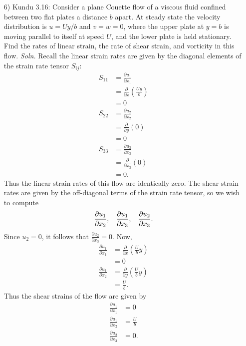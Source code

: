 \documentclass{article}
\begin{document}
\begin{itemize}
    \pagebreak
    \item[6)] Kundu 3.16: Consider a plane Couette flow of a viscous fluid confined between two flat plates a distance $b$ apart. At steady state the velocity distribution is $u = Uy/b$ and $v = w = 0$, where the upper plate at $y = b$ is moving parallel to itself at speed $U$, and the lower plate is held stationary. Find the rates of linear strain, the rate of shear strain, and vorticity in this flow.
    \newline\newline
    \textit{Soln.} Recall the linear strain rates are given by the diagonal elements of the strain rate tensor $S_{ij}$:
    \begin{align*}
        S_{11} &= \frac{\partial u_1}{\partial x_1}\\
        &= \frac{\partial }{\partial x}\left(\frac{Uy}{b}\right)\\
        &= 0\\
        S_{22} &= \frac{\partial u_2}{\partial x_2}\\
        &= \frac{\partial}{\partial y}\left(0\right)\\
        &= 0\\
        S_{33} &= \frac{\partial u_3}{\partial x_3}\\
        &= \frac{\partial }{\partial x_3}\left(0\right)\\
        &= 0.
    \end{align*}
    Thus the linear strain rates of this flow are identically zero. The shear strain rates are given by the off-diagonal terms of the strain rate tensor, so we wish to compute
    \[\frac{\partial u_1}{\partial x_2}, \hspace{0.3cm} \frac{\partial u_1}{\partial x_3}, \hspace{0.3cm} \frac{\partial u_2}{\partial x_3}.\]
    Since $u_2 = 0$, it follows that $\frac{\partial u_2}{\partial x_3} = 0$. Now, 
    \begin{align*}
        \frac{\partial u_1}{\partial x_1} &= \frac{\partial }{\partial x}\left(\frac{U}{b}y\right)\\
        &= 0\\
        \frac{\partial u_1}{\partial x_2} &= \frac{\partial }{\partial y}\left(\frac{U}{b}y\right)\\
        &= \frac{U}{b}.
    \end{align*}
    Thus the shear strains of the flow are given by
    \begin{align*}
        \frac{\partial u_1}{\partial x_1} &= 0\\
        \frac{\partial u_1}{\partial x_2} &= \frac{U}{b}\\
        \frac{\partial u_2}{\partial x_3} &= 0.
    \end{align*}
    

\end{itemize}
\end{document}
